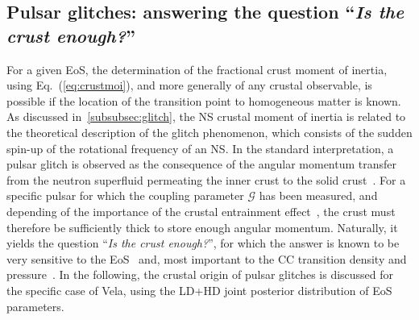 \subsection{Pulsar glitches: answering the question
``\textit{Is the crust enough?}''}\label{subsec:gli_stats}

For a given EoS, the determination of the fractional crust moment of inertia,
using Eq.~(\ref{eq:crustmoi}), 
and more generally of any crustal observable, is possible if 
the location of the transition point to homogeneous matter is known.
As discussed in~\ref{subsubsec:glitch}, the NS crustal moment of inertia is
related to the theoretical description of the glitch phenomenon, which consists
of the sudden spin-up of the rotational frequency of an NS. In the standard 
interpretation, a pulsar glitch is observed as the consequence of the angular 
momentum transfer from the neutron superfluid permeating the inner crust to the 
solid crust~\cite{Anderson1975}. For a specific pulsar for which the coupling 
parameter $\mathcal{G}$ has been measured, and depending of the importance of 
the crustal entrainment effect~\cite{Chamel2013}, the crust must therefore be 
sufficiently thick to store enough angular momentum. Naturally, it yields the 
question ``\textit{Is the crust enough?}'', for which the answer is known to be 
very sensitive to the EoS~\cite{Andersson2012,Piekarewicz2014} and, most 
important to the CC transition density and pressure~\cite{Carreau2019moi}. In 
the following, the crustal origin of pulsar glitches is discussed for the 
specific case of Vela, using the LD+HD joint posterior distribution of EoS 
parameters.

